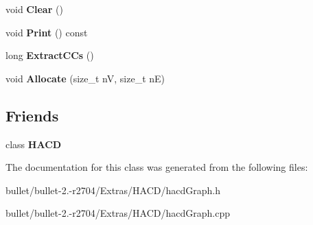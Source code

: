 \begin{DoxyCompactItemize}
\item 
\hypertarget{class_h_a_c_d_1_1_graph_a635da6550681de9e779c2deda2a282c1}{void {\bfseries Clear} ()}\label{class_h_a_c_d_1_1_graph_a635da6550681de9e779c2deda2a282c1}

\item 
\hypertarget{class_h_a_c_d_1_1_graph_a1144b794bf4a88c78808c4841549f5da}{void {\bfseries Print} () const }\label{class_h_a_c_d_1_1_graph_a1144b794bf4a88c78808c4841549f5da}

\item 
\hypertarget{class_h_a_c_d_1_1_graph_ab828956cb835d484e71c4e99a28c6d6f}{long {\bfseries Extract\+C\+Cs} ()}\label{class_h_a_c_d_1_1_graph_ab828956cb835d484e71c4e99a28c6d6f}

\item 
\hypertarget{class_h_a_c_d_1_1_graph_aadc33ab16180e196fd63c6f9f725989c}{void {\bfseries Allocate} (size\+\_\+t n\+V, size\+\_\+t n\+E)}\label{class_h_a_c_d_1_1_graph_aadc33ab16180e196fd63c6f9f725989c}

\end{DoxyCompactItemize}
\subsection*{Friends}
\begin{DoxyCompactItemize}
\item 
\hypertarget{class_h_a_c_d_1_1_graph_ab3497bc7797561d0c79ecef2f462e43a}{class {\bfseries H\+A\+C\+D}}\label{class_h_a_c_d_1_1_graph_ab3497bc7797561d0c79ecef2f462e43a}

\end{DoxyCompactItemize}


The documentation for this class was generated from the following files\+:\begin{DoxyCompactItemize}
\item 
bullet/bullet-\/2.-\/r2704/\+Extras/\+H\+A\+C\+D/hacd\+Graph.\+h\item 
bullet/bullet-\/2.-\/r2704/\+Extras/\+H\+A\+C\+D/hacd\+Graph.\+cpp\end{DoxyCompactItemize}
